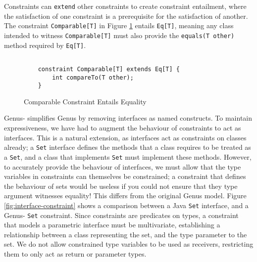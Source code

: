 Constraints can \texttt{extend} other constraints to create constraint entailment, where the satisfaction of one constraint is a prerequisite for the satisfaction of another. The constraint \texttt{Comparable[T]} in Figure \ref{fig:comparable-constraint} entails \texttt{Eq[T]}, meaning any class intended to witness \texttt{Comparable[T]} must also provide the \texttt{equals(T other)} method required by \texttt{Eq[T]}. \\

\begin{figure}[h]
    \centering
    \begin{verbatim}
    
    constraint Comparable[T] extends Eq[T] {
        int compareTo(T other);
    }
    \end{verbatim}
    \caption{Comparable Constraint Entails Equality}
    \label{fig:comparable-constraint}
\end{figure}

Genus- simplifies Genus by removing interfaces as named constructs. To maintain expressiveness, we have had to augment the behaviour of constraints to act as interfaces. This is a natural extension, as interfaces act as constraints on classes already; a \texttt{Set} interface defines the methods that a class requires to be treated as a \texttt{Set}, and a class that implements \texttt{Set} must implement these methods. However, to accurately provide the behaviour of interfaces, we must allow that the type variables in constraints can themselves be constrained; a constraint that defines the behaviour of sets would be useless if you could not ensure that they type argument witnesses equality! This differs from the original Genus model. Figure \ref{fig:interface-constraint} shows a comparison between a Java \texttt{Set} interface, and a Genus- \texttt{Set} constraint. Since constraints are predicates on types, a constraint that models a parametric interface must be multivariate, establishing a relationship between a class representing the set, and the type parameter to the set. We do not allow constrained type variables to be used as receivers, restricting them to only act as return or parameter types. \\

